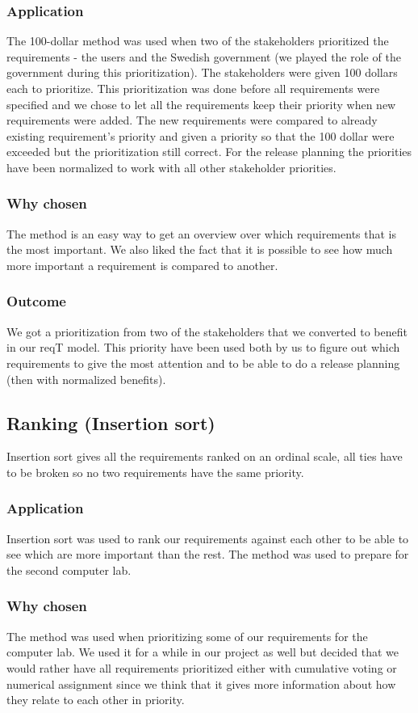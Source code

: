 \documentclass[a4paper]{article}
\begin{document}
		\subsubsection{Application}
			The 100-dollar method was used when two of the stakeholders prioritized the requirements - the users and the Swedish government (we played the role of the government during this prioritization). The stakeholders were given 100 dollars each to prioritize. This prioritization was done before all requirements were specified and we chose to let all the requirements keep their priority when new requirements were added. The new requirements were compared to already existing requirement's priority and given a priority so that the 100 dollar were exceeded but the prioritization still correct. For the release planning the priorities have been normalized to work with all other stakeholder priorities. 
		\subsubsection{Why chosen}
			The method is an easy way to get an overview over which requirements that is the most important. We also liked the fact that it is possible to see how much more important a requirement is compared to another.
		\subsubsection{Outcome}
			We got a prioritization from two of the stakeholders that we converted to benefit in our reqT model. This priority have been used both by us to figure out which requirements to give the most attention and to be able to do a release planning (then with normalized benefits).

	\subsection{Ranking (Insertion sort)}
		Insertion sort gives all the requirements ranked on an ordinal scale, all ties have to be broken so no two requirements have the same priority.
		\subsubsection{Application}
			Insertion sort was used to rank our requirements against each other to be able to see which are more important than the rest. The method was used to prepare for the second computer lab.
		\subsubsection{Why chosen}
			The method was used when prioritizing some of our requirements for the computer lab. We used it for a while in our project as well but decided that we would rather have all requirements prioritized either with cumulative voting or numerical assignment since we think that it gives more information about how they relate to each other in priority.
\end{document}

